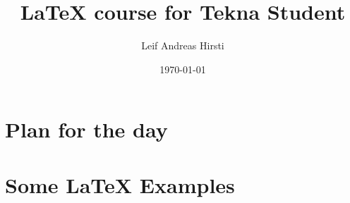 \documentclass{beamer}
\title[\LaTeX{} for Tekna Student]{\LaTeX{} course for Tekna Student}
\author{Leif Andreas Hirsti}
\institute{Tekna Ung Agder}
\date{\today}
\begin{document}
\begin{frame}
  \titlepage
\end{frame}



\section{Plan for the day}



\section{Some \LaTeX{} Examples}




\end{document}
